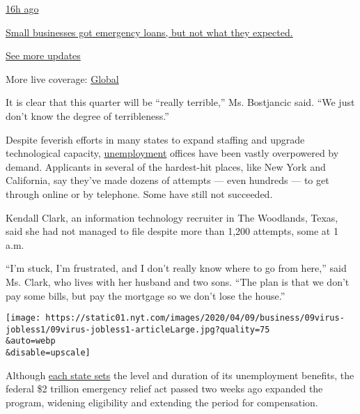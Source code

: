 \href{https://www.nytimes.com/live/2020/08/03/business/stock-market-today-coronavirus?action=click\&pgtype=Article\&state=default\&region=MAIN_CONTENT_1\&context=storylines_live_updates\#small-businesses-got-emergency-loans-but-not-what-they-expected}{16h
ago}

\href{https://www.nytimes.com/live/2020/08/03/business/stock-market-today-coronavirus?action=click\&pgtype=Article\&state=default\&region=MAIN_CONTENT_1\&context=storylines_live_updates\#small-businesses-got-emergency-loans-but-not-what-they-expected}{Small
businesses got emergency loans, but not what they expected.}

\href{https://www.nytimes.com/live/2020/08/03/business/stock-market-today-coronavirus?action=click\&pgtype=Article\&state=default\&region=MAIN_CONTENT_1\&context=storylines_live_updates}{See
more updates}

More live coverage:
\href{https://www.nytimes.com/2020/08/04/world/coronavirus-covid-19.html?action=click\&pgtype=Article\&state=default\&region=MAIN_CONTENT_1\&context=storylines_live_updates}{Global}

It is clear that this quarter will be ``really terrible,'' Ms.
Bostjancic said. ``We just don't know the degree of terribleness.''

Despite feverish efforts in many states to expand staffing and upgrade
technological capacity,
\href{https://www.nytimes.com/2020/04/16/us/california-unemployment-edd-coronavirus.html}{unemployment}
offices have been vastly overpowered by demand. Applicants in several of
the hardest-hit places, like New York and California, say they've made
dozens of attempts --- even hundreds --- to get through online or by
telephone. Some have still not succeeded.

Kendall Clark, an information technology recruiter in The Woodlands,
Texas, said she had not managed to file despite more than 1,200
attempts, some at 1 a.m.

``I'm stuck, I'm frustrated, and I don't really know where to go from
here,'' said Ms. Clark, who lives with her husband and two sons. ``The
plan is that we don't pay some bills, but pay the mortgage so we don't
lose the house.''

\texttt{[image: https://static01.nyt.com/images/2020/04/09/business/09virus-jobless1/09virus-jobless1-articleLarge.jpg?quality=75\\\&auto=webp\\\&disable=upscale]}

Although
\href{https://oui.doleta.gov/unemploy/pdf/uilawcompar/2019/complete.pdf}{each
state sets} the level and duration of its unemployment benefits, the
federal \$2 trillion emergency relief act passed two weeks ago expanded
the program, widening eligibility and extending the period for
compensation.

